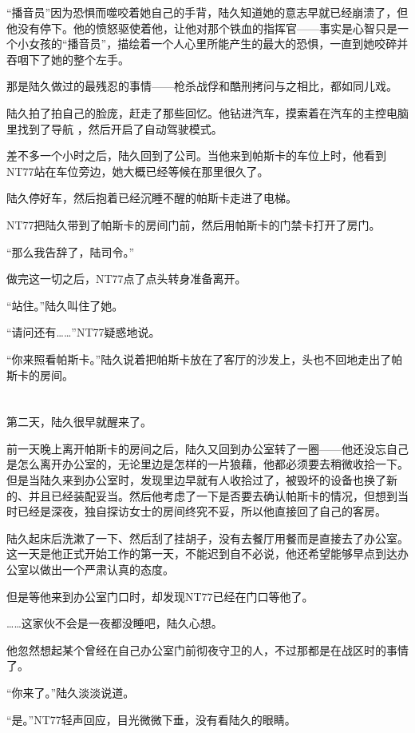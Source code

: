 “播音员”因为恐惧而噬咬着她自己的手背，陆久知道她的意志早就已经崩溃了，但他没有停下。他的愤怒驱使着他，让他对那个铁血的指挥官——事实是心智只是一个小女孩的“播音员”，描绘着一个人心里所能产生的最大的恐惧，一直到她咬碎并吞咽下了她的整个左手。

那是陆久做过的最残忍的事情——枪杀战俘和酷刑拷问与之相比，都如同儿戏。

陆久拍了拍自己的脸庞，赶走了那些回忆。他钻进汽车，摸索着在汽车的主控电脑里找到了导航 ，然后开启了自动驾驶模式。

差不多一个小时之后，陆久回到了公司。当他来到帕斯卡的车位上时，他看到NT77站在车位旁边，她大概已经等候在那里很久了。

陆久停好车，然后抱着已经沉睡不醒的帕斯卡走进了电梯。

NT77把陆久带到了帕斯卡的房间门前，然后用帕斯卡的门禁卡打开了房门。

“那么我告辞了，陆司令。”

做完这一切之后，NT77点了点头转身准备离开。

“站住。”陆久叫住了她。

“请问还有……”NT77疑惑地说。

“你来照看帕斯卡。”陆久说着把帕斯卡放在了客厅的沙发上，头也不回地走出了帕斯卡的房间。

\section*{}

第二天，陆久很早就醒来了。

前一天晚上离开帕斯卡的房间之后，陆久又回到办公室转了一圈——他还没忘自己是怎么离开办公室的，无论里边是怎样的一片狼藉，他都必须要去稍微收拾一下。但是当陆久来到办公室时，发现里边早就有人收拾过了，被毁坏的设备也换了新的、并且已经装配妥当。然后他考虑了一下是否要去确认帕斯卡的情况，但想到当时已经是深夜，独自探访女士的房间终究不妥，所以他直接回了自己的客房。

陆久起床后洗漱了一下、然后刮了挂胡子，没有去餐厅用餐而是直接去了办公室。这一天是他正式开始工作的第一天，不能迟到自不必说，他还希望能够早点到达办公室以做出一个严肃认真的态度。

但是等他来到办公室门口时，却发现NT77已经在门口等他了。

……这家伙不会是一夜都没睡吧，陆久心想。

他忽然想起某个曾经在自己办公室门前彻夜守卫的人，不过那都是在战区时的事情了。

“你来了。”陆久淡淡说道。

“是。”NT77轻声回应，目光微微下垂，没有看陆久的眼睛。

